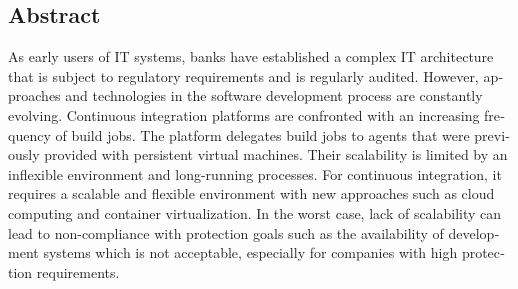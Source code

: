 

\begin{otherlanguage}{american}
	\chapter*{Abstract}
	As early users of IT systems, banks have established a complex IT architecture that is subject to regulatory requirements and is regularly audited. However, approaches and technologies in the software development process are constantly evolving. Continuous integration platforms are confronted with an increasing frequency of build jobs. The platform delegates build jobs to agents that were previously provided with persistent virtual machines. Their scalability is limited by an inflexible environment and long-running processes. For continuous integration, it requires a scalable and flexible environment with new approaches such as cloud computing and container virtualization. In the worst case, lack of scalability can lead to non-compliance with protection goals such as the availability of development systems which is not acceptable, especially for companies with high protection requirements.
\end{otherlanguage}